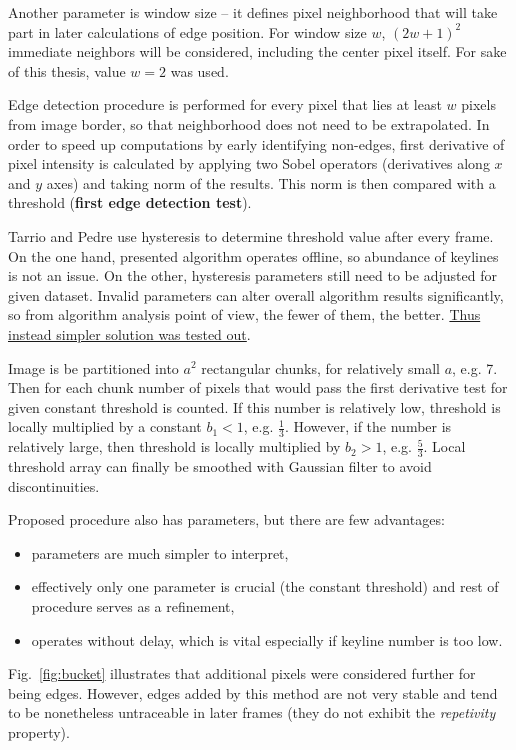 Another parameter is window size -- it defines pixel neighborhood that will take part in later calculations of edge position. For window size $w$, $(2w+1)^2$ immediate neighbors will be considered, including the center pixel itself. For sake of this thesis, value $w = 2$ was used.

Edge detection procedure is performed for every pixel that lies at least $w$ pixels from image border, so that neighborhood does not need to be extrapolated. In order to speed up computations by early identifying non-edges, first derivative of pixel intensity is calculated by applying two Sobel operators (derivatives along $x$ and $y$ axes) and taking norm of the results. This norm is then compared with a threshold (\textbf{first edge detection test}).

Tarrio and Pedre use hysteresis to determine threshold value after every frame. On the one hand, presented algorithm operates offline, so abundance of keylines is not an issue. On the other, hysteresis parameters still need to be adjusted for given dataset. Invalid parameters can alter overall algorithm results significantly, so from algorithm analysis point of view, the fewer of them, the better. \underline{Thus instead simpler solution was tested out}.

Image is be partitioned into $a^2$ rectangular chunks, for relatively small $a$, e.g. 7. Then for each chunk number of pixels that would pass the first derivative test for given constant threshold is counted. If this number is relatively low, threshold is locally multiplied by a constant $b_{1} < 1$, e.g. $\frac{1}{3}$. However, if the number is relatively large, then threshold is locally multiplied by $b_{2} > 1$, e.g. $\frac{5}{3}$. Local threshold array can finally be smoothed with Gaussian filter to avoid discontinuities.

Proposed procedure also has parameters, but there are few advantages:
\begin{itemize}
	\item parameters are much simpler to interpret,
	\item effectively only one parameter is crucial (the constant threshold) and rest of procedure serves as a refinement,
	\item operates without delay, which is vital especially if keyline number is too low.
\end{itemize}

Fig.~\ref{fig:bucket} illustrates that additional pixels were considered further for being edges. However, edges added by this method are not very stable and tend to be nonetheless untraceable in later frames (they do not exhibit the \textit{repetivity} property).

